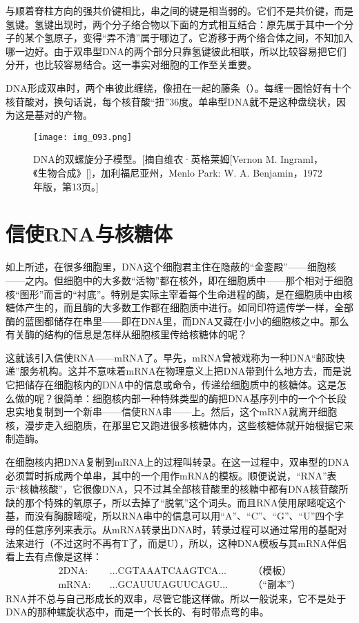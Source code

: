 与顺着脊柱方向的强共价键相比，串之间的键是相当弱的。它们不是共价键，而是氢键。氢键出现时，两个分子络合物以下面的方式相互结合：原先属于其中一个分子的某个氢原子，变得“弄不清”属于哪边了。它游移于两个络合体之间，不知加入哪一边好。由于双串型DNA的两个部分只靠氢键彼此相联，所以比较容易把它们分开，也比较容易结合。这一事实对细胞的工作至关重要。

DNA形成双串时，两个串彼此缠绕，像扭在一起的藤条（）。每缠一圈恰好有十个核苷酸对，换句话说，每个核苷酸“扭”$36$度。单串型DNA就不是这种盘绕状，因为这是基对的产物。

\begin{figure}
\texttt{[image: img\_093.png]}
\caption[DNA的双螺旋分子模型。]
  {DNA的双螺旋分子模型。[摘自维农·英格莱姆[Vernon M. Ingraml，《生物合成》[]，加利福尼亚州，Menlo Park: W. A. Benjamin，1972年版，第13页。]}
\end{figure}

\section{信使RNA与核糖体}

如上所述，在很多细胞里，DNA这个细胞君主住在隐蔽的“金銮殿”——细胞核——之内。但细胞中的大多数“活物”都在核外，即在细胞质中——那个相对于细胞核“图形”而言的“衬底”。特别是实际主宰着每个生命进程的酶，是在细胞质中由核糖体产生的，而且酶的大多数工作都在细胞质中进行。如同印符遗传学一样，全部酶的蓝图都储存在串里——即在DNA里，而DNA又藏在小小的细胞核之中。那么有关酶的结构的信息是怎样从细胞核里传给核糖体的呢？

这就该引入信使RNA——mRNA了。早先，mRNA曾被戏称为一种DNA“邮政快递”服务机构。这并不意味着mRNA在物理意义上把DNA带到什么地方去，而是说它把储存在细胞核内的DNA中的信息或命令，传递给细胞质中的核糖体。这是怎么做的呢？很简单：细胞核内部一种特殊类型的酶把DNA基序列中的一个个长段忠实地复制到一个新串——信使RNA串——上。然后，这个mRNA就离开细胞核，漫步走入细胞质，在那里它又跑进很多核糖体内，这些核糖体就开始根据它来制造酶。

在细胞核内把DNA复制到mRNA上的过程叫转录。在这一过程中，双串型的DNA必须暂时拆成两个单串，其中的一个用作mRNA的模板。顺便说说，“RNA”表示“核糖核酸”，它很像DNA，只不过其全部核苷酸里的核糖中都有DNA核苷酸所缺的那个特殊的氧原子，所以去掉了“脱氧”这个词头。而且RNA使用尿嘧啶这个基，而没有胸腺嘧啶，所以RNA串中的信息可以用“A”、“C”、“G”、“U”四个字母的任意序列来表示。从mRNA转录出DNA时，转录过程可以通过常用的基配对法来进行（不过这时不再有T了，而是U），所以，这种DNA模板与其mRNA伴侣看上去有点像是这样：
\begin{alignat*}{2}
\mathrm{DNA}:&\quad\dotsc\mathrm{CGTAAATCAAGTCA}\dotsc  &\quad&\text{（模板）}\\
\mathrm{mRNA}:&\quad\dotsc\mathrm{GCAUUUAGUUCAGU}\dotsc &     &\text{（“副本”）}
\end{alignat*}
RNA并不总与自己形成长的双串，尽管它能这样做。所以一般说来，它不是处于DNA的那种螺旋状态中，而是一个长长的、有时带点弯的串。

